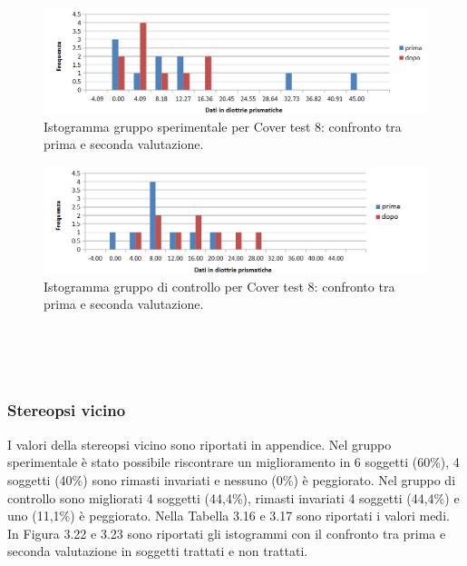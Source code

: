  \begin{figure}[h!]
	\centering
	\includegraphics[scale=0.38]{source/grafici/cover_test_8_trattati_nuovo.png}
	\caption[Istogramma gruppo sperimentale per Cover test 8]{Istogramma gruppo sperimentale per Cover test 8: confronto tra prima e seconda valutazione.}
	\label{fig:issuexample}
\end{figure}
 \begin{figure}[h!]
	\centering
	\includegraphics[scale=0.38]{source/grafici/cover_test_8_giustissimo_non_trattati.png}
	\caption[Istogramma gruppo di controllo per Cover test 8]{Istogramma gruppo di controllo per Cover test 8: confronto tra prima e seconda valutazione.}
	\label{fig:issuexample}
\end{figure}
\\\ \\\
\subsubsection{Stereopsi vicino}

I valori della stereopsi vicino sono riportati in appendice. Nel gruppo sperimentale è stato possibile riscontrare un miglioramento in 6 soggetti (60\%), 4 soggetti (40\%) sono rimasti invariati e nessuno (0\%) è peggiorato. Nel gruppo di controllo sono migliorati 4 soggetti (44,4\%), rimasti invariati 4 soggetti (44,4\%) e uno (11,1\%) è peggiorato. Nella Tabella 3.16 e 3.17 sono riportati i valori medi. In Figura 3.22 e 3.23 sono riportati gli istogrammi con il confronto tra prima e seconda valutazione in soggetti trattati e non trattati.

